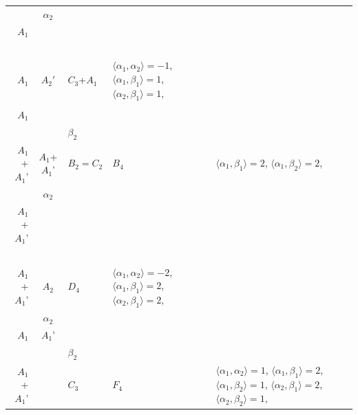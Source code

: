 \documentclass[12pt]{report}
\begin{document}
\begin{appendix}
{\begin{longtable}{rcl p{1cm}p{1cm}p{3cm} }
\\
\begin{tabular}{cc}$\alpha_1$+ & $\alpha_2$\\\tiny{ $A_1$ } & \tiny{  }\end{tabular} &\begin{tabular}{c} = \\~ \end{tabular} & \begin{tabular}{c}$\beta_1$\\\tiny{ $A_1$ }\end{tabular} & $A_2'$ & $C_3$+$A_1$ & $\langle\alpha_1, \alpha_2\rangle=-1$,  $\langle\alpha_1, \beta_1\rangle=1$, $\langle\alpha_2, \beta_1\rangle=1$, 
\\
\begin{tabular}{c}2$\alpha_1$\\\tiny{ $A_1$ }\end{tabular} &\begin{tabular}{c} = \\~ \end{tabular} & \begin{tabular}{cc}$\beta_1$+ & $\beta_2$\\\tiny{ $A_1$+$A_1$' } & \tiny{ $A_1$+$A_1$' }\end{tabular} & $B_2=C_2$ & $B_4$ &  $\langle\alpha_1, \beta_1\rangle=2$, $\langle\alpha_1, \beta_2\rangle=2$, 
\\
\begin{tabular}{cc}$\alpha_1$+ & $\alpha_2$\\\tiny{ $A_1$+$A_1$' } & \tiny{  }\end{tabular} &\begin{tabular}{c} = \\~ \end{tabular} & \begin{tabular}{c}$\beta_1$\\\tiny{ $A_1$+$A_1$' }\end{tabular} & $A_2$ & $D_4$ & $\langle\alpha_1, \alpha_2\rangle=-2$,  $\langle\alpha_1, \beta_1\rangle=2$, $\langle\alpha_2, \beta_1\rangle=2$, 
\\
\begin{tabular}{cc}$\alpha_1$+ & $\alpha_2$\\\tiny{ $A_1$ } & \tiny{ $A_1$' }\end{tabular} &\begin{tabular}{c} = \\~ \end{tabular} & \begin{tabular}{cc}$\beta_1$+ & $\beta_2$\\\tiny{ $A_1$+$A_1$' } & \tiny{  }\end{tabular} & $C_3$ & $F_4$ & $\langle\alpha_1, \alpha_2\rangle=1$,  $\langle\alpha_1, \beta_1\rangle=2$, $\langle\alpha_1, \beta_2\rangle=1$, $\langle\alpha_2, \beta_1\rangle=2$, $\langle\alpha_2, \beta_2\rangle=1$, 

\end{longtable}}
\end{appendix}
\end{document}
